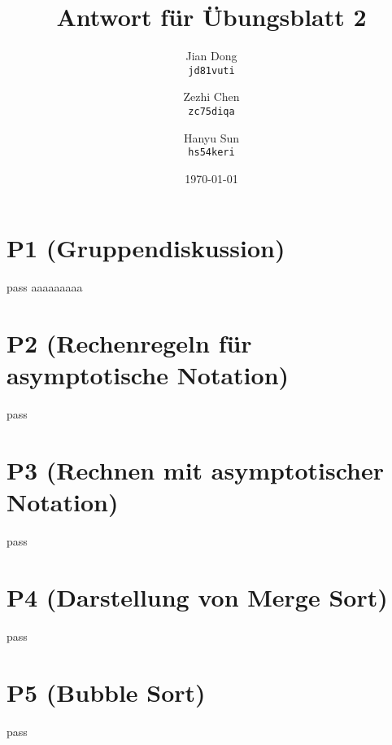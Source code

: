 \documentclass[a4paper,12pt]{article}
\begin{document}
\title{Antwort für Übungsblatt 2}
\author{
  Jian Dong\\
  \texttt{jd81vuti}
  \and
  Zezhi Chen\\
  \texttt{zc75diqa}
  \and
  Hanyu Sun\\
  \texttt{hs54keri}
}
\date{\today}
\maketitle

\section{P1 (Gruppendiskussion)}pass
aaaaaaaaa

\section{P2 (Rechenregeln für asymptotische Notation)}
pass

\section{P3 (Rechnen mit asymptotischer Notation)}
pass

\section{P4 (Darstellung von Merge Sort)}
pass

\section{P5 (Bubble Sort)}
pass
\end{document}
